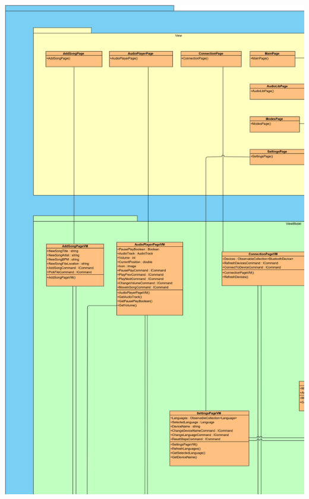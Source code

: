 \documentclass[../entwurf.tex]{subfiles}
\begin{document}
\includegraphics[scale=0.12]{../graphics/uml_diagramme/Gesamt/1.png}
\newpage
\end{document}

